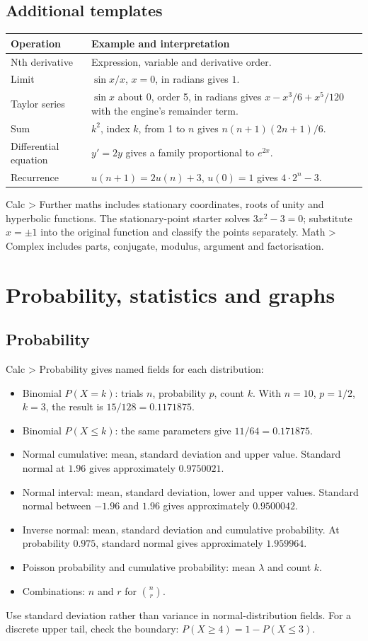\documentclass[11pt,a4paper]{article}
\newcommand{\menu}[1]{\textsf{\color{teal}#1}}
\begin{document}
\subsection{Additional templates}
\begin{tabularx}{\linewidth}{@{}lX@{}}\toprule
Operation & Example and interpretation\\\midrule
Nth derivative & Expression, variable and derivative order.\\
Limit & $\sin x/x$, $x=0$, in radians gives $1$.\\
Taylor series & $\sin x$ about $0$, order 5, in radians gives $x-x^3/6+x^5/120$ with the engine's remainder term.\\
Sum & $k^2$, index $k$, from 1 to $n$ gives $n(n+1)(2n+1)/6$.\\
Differential equation & $y'=2y$ gives a family proportional to $e^{2x}$.\\
Recurrence & $u(n+1)=2u(n)+3$, $u(0)=1$ gives $4\cdot2^n-3$.\\\bottomrule
\end{tabularx}

\menu{Calc > Further maths} includes stationary coordinates, roots of unity and hyperbolic functions. The stationary-point starter solves $3x^2-3=0$; substitute $x=\pm1$ into the original function and classify the points separately. \menu{Math > Complex} includes parts, conjugate, modulus, argument and factorisation.
\clearpage

\section{Probability, statistics and graphs}
\subsection{Probability}
\menu{Calc > Probability} gives named fields for each distribution:
\begin{itemize}
\item Binomial $P(X=k)$: trials $n$, probability $p$, count $k$. With $n=10$, $p=1/2$, $k=3$, the result is $15/128=0.1171875$.
\item Binomial $P(X\le k)$: the same parameters give $11/64=0.171875$.
\item Normal cumulative: mean, standard deviation and upper value. Standard normal at $1.96$ gives approximately $0.9750021$.
\item Normal interval: mean, standard deviation, lower and upper values. Standard normal between $-1.96$ and $1.96$ gives approximately $0.9500042$.
\item Inverse normal: mean, standard deviation and cumulative probability. At probability $0.975$, standard normal gives approximately $1.959964$.
\item Poisson probability and cumulative probability: mean $\lambda$ and count $k$.
\item Combinations: $n$ and $r$ for $\binom nr$.
\end{itemize}
Use standard deviation rather than variance in normal-distribution fields. For a discrete upper tail, check the boundary: $P(X\ge4)=1-P(X\le3)$.
\end{document}
